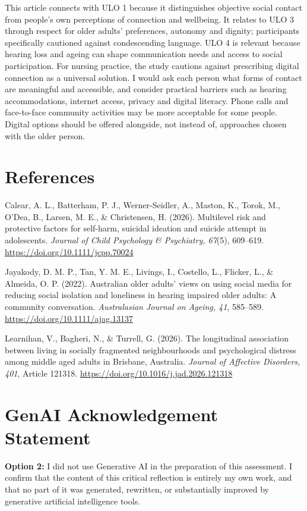 \documentclass[12pt,a4paper]{article}
\newcommand{\referenceentry}[1]{%
  \par\noindent\hangindent=0.5in\hangafter=1 #1\par
}
\begin{document}
This article connects with ULO 1 because it distinguishes objective social contact from people's own perceptions of connection and wellbeing. It relates to ULO 3 through respect for older adults' preferences, autonomy and dignity; participants specifically cautioned against condescending language. ULO 4 is relevant because hearing loss and ageing can shape communication needs and access to social participation. For nursing practice, the study cautions against prescribing digital connection as a universal solution. I would ask each person what forms of contact are meaningful and accessible, and consider practical barriers such as hearing accommodations, internet access, privacy and digital literacy. Phone calls and face-to-face community activities may be more acceptable for some people. Digital options should be offered alongside, not instead of, approaches chosen with the older person.

\newpage
\section*{References}

\referenceentry{Calear, A. L., Batterham, P. J., Werner-Seidler, A., Maston, K., Torok, M., O'Dea, B., Larsen, M. E., \& Christensen, H. (2026). Multilevel risk and protective factors for self-harm, suicidal ideation and suicide attempt in adolescents. \textit{Journal of Child Psychology \& Psychiatry, 67}(5), 609--619. \url{https://doi.org/10.1111/jcpp.70024}}

\referenceentry{Jayakody, D. M. P., Tan, Y. M. E., Livings, I., Costello, L., Flicker, L., \& Almeida, O. P. (2022). Australian older adults' views on using social media for reducing social isolation and loneliness in hearing impaired older adults: A community conversation. \textit{Australasian Journal on Ageing, 41}, 585--589. \url{https://doi.org/10.1111/ajag.13137}}

\referenceentry{Learnihan, V., Bagheri, N., \& Turrell, G. (2026). The longitudinal association between living in socially fragmented neighbourhoods and psychological distress among middle aged adults in Brisbane, Australia. \textit{Journal of Affective Disorders, 401}, Article 121318. \url{https://doi.org/10.1016/j.jad.2026.121318}}

\newpage
\section*{GenAI Acknowledgement Statement}
\noindent \textbf{Option 2:} I did not use Generative AI in the preparation of this assessment. I confirm that the content of this critical reflection is entirely my own work, and that no part of it was generated, rewritten, or substantially improved by generative artificial intelligence tools.
\end{document}
